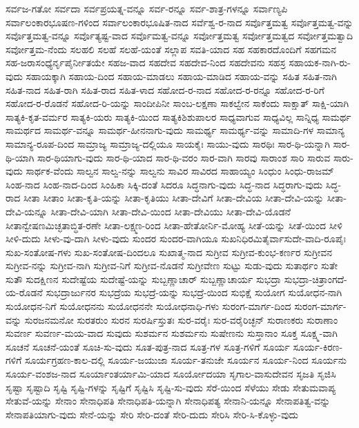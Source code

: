 ಸರ್ವಜ-ಗತೋ
ಸರ್ವದಾ
ಸರ್ವಪ್ರಯತ್ನ-ವನ್ನೂ
ಸರ್ವ-ರನ್ನೂ
ಸರ್ವ-ಶಾತ್ರ-ಗಳನ್ನೂ
ಸರ್ವಾಣ್ಯಪಿ
ಸರ್ವಾಲಂಕಾರಭೂಷಣ-ಗಳಿಂದ
ಸರ್ವಾಲಂಕಾರಭೂಷಿತ-ನಾದ
ಸರ್ವೆಶ್ವ-ರ-ನಾದ
ಸರ್ವೊತ್ತಮತ್ವ
ಸರ್ವೊತ್ತಮತ್ವ-ವನ್ನು
ಸರ್ವೊತ್ತಮತ್ವ-ವನ್ನೂ
ಸರ್ವೊತ್ಯಷ್ಟ-ವಾದ
ಸರ್ವೊಮತ್ವ-ವನ್ನೂ
ಸರ್ವೋತ್ತಮತ್ವ
ಸರ್ವೋತ್ತಮತ್ವದ
ಸರ್ವೋತ್ತಮತ್ವಾದಿ
ಸರ್ವೋತ್ತಮ-ನೆಂದು
ಸಲಹಲಿ
ಸಲಹೆ
ಸಲಹೆ-ಯಂತೆ
ಸಲ್ಲಾಪ
ಸವತಿ-ಯಾದ
ಸಹ
ಸಹಕಾರದೊಂದಿಗೆ
ಸಹಗಮನ
ಸಹ-ಜರಾಸಂಧ್ಯೆರ್ನೃಪೈರ್ನೀತಯೇ
ಸಹಜ-ವಾದ
ಸಹದೇವ
ಸಹದೇವ-ನಿಂದ
ಸಹದೇವನು
ಸಹಸ್ರ
ಸಹಾಯಕ-ನಾಗಿ-ರು-ವುದು
ಸಹಾಯಕ್ಕಾಗಿ
ಸಹಾಯ-ದಿಂದ
ಸಹಾಯ-ಮಾಡಲು
ಸಹಾಯ-ಮಾಡಿದ
ಸಹಾಯ-ವನ್ನು
ಸಹಿತ
ಸಹಿತ-ನಾಗಿ
ಸಹಿತ-ನಾದ
ಸಹಿತ-ರಾಗಿ
ಸಹಿತ-ರಾದ
ಸಹಿತ-ಳಾದ
ಸಹೋದ-ರ-ನಾದ
ಸಹೋದ-ರ-ರನ್ನೂ
ಸಹೋದ-ರ-ರಿಗೆ
ಸಹೋದ-ರ-ರೊಡನೆ
ಸಹೋದ-ರಿ-ಯನ್ನು
ಸಾಂದೀಪಿನೀ
ಸಾಂಬ-ಲಕ್ಷಣಾ
ಸಾಕಲ್ವೇನ
ಸಾಕೆಂದು
ಸಾಕ್ಷಾತ್
ಸಾಕ್ಷಿ-ಯಾಗಿ
ಸಾತ್ಯಕಿ-ಕೃತ-ವರ್ಮರ
ಸಾತ್ಯಕಿ-ಯರು
ಸಾತ್ಯಕಿ-ಯಿಂದ
ಸಾತ್ಯಕಿಶಿಶುಪಾಲರ
ಸಾಧ್ಯವಾಗುವ
ಸಾಧ್ಯವಿಲ್ಲ
ಸಾನ್ನಿಧ್ಯ
ಸಾಮರ್ಥ
ಸಾಮರ್ಥದ
ಸಾಮರ್ಥ-ವನ್ನೂ
ಸಾಮರ್ಥ-ಹೀನನಾಗು-ವುದು
ಸಾಮರ್ಥ್ಯ
ಸಾಮರ್ಥ್ಯ-ವನ್ನು
ಸಾಮಾದಿ-ಗಳ
ಸಾಮಾನ್ಯ
ಸಾಮಾನ್ಯ-ರೂಪ-ದಿಂದ
ಸಾಮ್ರಾಜ್ಯ
ಸಾಮ್ರಾಜ್ಯ-ದಲ್ಲಿಯೂ
ಸಾಯಕೈಃ
ಸಾಯು-ವುದು
ಸಾರಥಿಃ
ಸಾರ-ಥಿ-ಯನ್ನಾಗಿ
ಸಾರ-ಥಿ-ಯಾಗಿ
ಸಾರ-ಥಿಯಾಗು-ವುದು
ಸಾರ-ಥಿ-ಯಾದ
ಸಾರ-ಥಿ-ವರಂ
ಸಾರ-ವಾಗಿ
ಸಾರವು
ಸಾರಾಂಶ
ಸಾರಿ
ಸಾರುವ
ಸಾರು-ವುದು
ಸಾರ್ಥಕ-ವೆಂದು
ಸಾಲ್ವನ
ಸಾಲ್ವ-ನನ್ನು
ಸಾಲ್ವನು
ಸಾವಿರ
ಸಾವಿರದ
ಸಾಹಾಯ್ಯಂ
ಸಿಂಧುಂ
ಸಿಂಧು-ರಾಜಮ್
ಸಿಂಹ-ನಾದ
ಸಿಂಹ-ನಾದ-ದಿಂದ
ಸಿಂಹಿಕಾ
ಸಿಕ್ಕಿ-ದಂತೆ
ಸಿದರೂ
ಸಿದ್ಧನಾಗು-ವುದು
ಸಿದ್ಧ-ನಾದ
ಸಿದ್ಧರಾಗು-ವುದು
ಸಿದ್ಧ-ರಾದ
ಸೀತಾ
ಸೀತಾಂ
ಸೀತಾ-ಕೃತಿ-ಯನ್ನು
ಸೀತಾ-ಕೃತಿಯು
ಸೀತಾ-ದೇವಿಗೆ
ಸೀತಾ-ದೇವಿಯ
ಸೀತಾ-ದೇವಿ-ಯನ್ನು
ಸೀತಾ-ದೇವಿ-ಯನ್ನೂ
ಸೀತಾ-ದೇವಿ-ಯಾಗಿ
ಸೀತಾ-ದೇವಿ-ಯಿಂದ
ಸೀತಾ-ದೇವಿಯು
ಸೀತಾ-ದೇವಿ-ಯೊಡನೆ
ಸೀತಾನ್ವೇಷಣಮಿಚ್ಛತಾಬ್ಧಿತ-ರಣೇ
ಸೀತಾ-ಲಕ್ಷ್ಮಣ-ರಿಂದ
ಸೀತಾ-ಹೇತೋರ್ನಿ-ಮೋಹ್ಯ
ಸೀತೆ-ಯನ್ನು
ಸೀತೆ-ಯಿಂದ
ಸೀಳಿ
ಸೀಳಿ-ದುದು
ಸೀಳು-ವು-ದಾಗಿ
ಸೀಳು-ವುದು
ಸುಂದರ
ಸುಂದರ-ವಾಗಿಯೂ
ಸುಖನಿಧಿರಮಿತೈರ್ವಾಸುದೇ-ವಾದಿ-ರೂಪೈಃ
ಸುಖ-ಸಂತೋಷ-ಗಳು
ಸುಖ-ಸಂತೋಷ-ದಿಂದಲೂ
ಸುಖಾತ್ಮ-ನಾದ
ಸುಗ್ರೀವ
ಸುಗ್ರೀವ-ಕುಂಭ-ಕರ್ಣರ
ಸುಗ್ರೀವನ
ಸುಗ್ರೀವ-ನನ್ನು
ಸುಗ್ರೀವ-ನಾಗಿ
ಸುಗ್ರೀವ-ನಿಗೆ
ಸುಗ್ರೀವ-ನೊಡನೆ
ಸುಗ್ರೀವೇಣ
ಸುಟ್ಟು
ಸುಡು-ವುದು
ಸುತಾರ್ಥಂ
ಸುತೇ
ಸುತೌ
ಸುದಕ್ಷಿಣನ
ಸುದೇಷ್ಟೆಯ
ಸುದೇಷ್ಟೆ-ಯನ್ನು
ಸುಬ್ಬಣ್ಣಾಚಾರ್
ಸುಬ್ಬಣ್ಣಾಚಾರ್ಯ
ಸುಭದ್ರಾ
ಸುಭದ್ರಾ-ಚಿತ್ರಾಂಗದೆ-ಯ-ರೊಡನೆ
ಸುಭದ್ರಾರ್ಜುನರ
ಸುಭದ್ರೆಯ
ಸುಭದ್ರೆ-ಯನ್ನು
ಸುಭದ್ರೆ-ಯಿಂದ
ಸುಭಿಕ್ಷೆ
ಸುಯೋಗ
ಸುಯೋಧನ-ನಾಗಿ
ಸುಯೋಧನ-ನಿಗೆ
ಸುಯೋಧನನು
ಸುಯೋಧನನೇ
ಸುಯೋಧನಾಧಿ-ಗಳು
ಸುರಂಗ-ಮಾರ್ಗ-ದಿಂದ
ಸುರಂಗ-ಮಾರ್ಗ-ವನ್ನು
ಸುರಜನಮನೋ
ಸುರತರುಂ
ಸುರನ
ಸುರರ್ಷಿಸ್ತುತಃ
ಸುರ-ವರೈಃ
ಸುರ-ವರೈರಿಚ್ಛನ್
ಸುರಾಣಕರು
ಸುರಾಣಾಂ
ಸುವರ್ಣ
ಸುವರ್ಣ-ಮಯ-ವಾದ
ಸುವುದು
ಸುಶರ್ಮನ
ಸುಶರ್ಮನು
ಸುಷೇಣನು
ಸುಸ್ತಾನಾಂ
ಸೂಕ್ತ
ಸೂಕ್ಷ್ಮ-ವಾಗಿ
ಸೂಚನೆ
ಸೂಚನೆ-ಯಂತೆ
ಸೂಚಿ-ಸು-ವುದು
ಸೂತ-ಪುತ್ರ-ನಾದ
ಸೂತ್ರ-ಗಳ
ಸೂತ್ರ-ಗಳಿಗೆ
ಸೂರ್ಯ
ಸೂರ್ಯ-ಕಿರಣ-ಗಳಿಗೆ
ಸೂರ್ಯಗ್ರಹಣ-ಕಾಲ-ದಲ್ಲಿ
ಸೂರ್ಯ-ಜಯುಜಾ
ಸೂರ್ಯ-ತನುಜೇ
ಸೂರ್ಯನ
ಸೂರ್ಯ-ನಿಂದ
ಸೂರ್ಯನು
ಸೂರ್ಯ-ವಂಶಜ-ನಾದ
ಸೂರ್ಯಾಂತರ್ಯಾಮಿ-ಯಾದ
ಸೂರ್ಯೋದಯಾ
ಸೃಗಾಲ-ವಾಸುದೇವನ
ಸೃಜತಿ
ಸೃಜಿಸಿ
ಸೃಷ್ಟಾ
ಸೃಷ್ಟಾದಿ
ಸೃಷ್ಟಿ
ಸೃಷ್ಟಿ-ಗಳನ್ನು
ಸೃಷ್ಟಿಗೆ
ಸೃಷ್ಟಿಸಿ
ಸೃಷ್ಟಿ-ಸು-ವುದು
ಸೆರೆ-ಯಿಂದ
ಸೆಳೆಯು
ಸೇಡು
ಸೇತುಮವಾಪ್ಯ
ಸೇತುವೆ-ಯನ್ನು
ಸೇನಾಂ
ಸೇನಾಧಿಪತಿ
ಸೇನಾಧಿಪತಿ-ಯನ್ನಾಗಿ
ಸೇನಾಧಿಪತ್ಯ
ಸೇನಾನಿ-ಯನ್ನೂ
ಸೇನಾಪತಿತ್ವ-ವನ್ನು
ಸೇನಾಪತಿಯಾಗು-ವುದು
ಸೇನೆ-ಯನ್ನು
ಸೇರಿ
ಸೇರಿ-ದಂತೆ
ಸೇರಿ-ದುದು
ಸೇರಿಸಿ
ಸೇರಿ-ಸಿ-ಕೊಳ್ಳು-ವುದು
